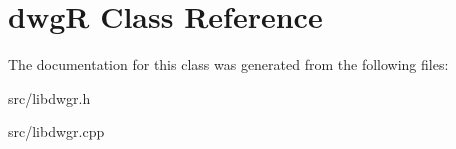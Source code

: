 \hypertarget{classdwg_r}{}\section{dwg\+R Class Reference}
\label{classdwg_r}


The documentation for this class was generated from the following files\+:\begin{DoxyCompactItemize}
\item 
src/libdwgr.\+h\item 
src/libdwgr.\+cpp\end{DoxyCompactItemize}
